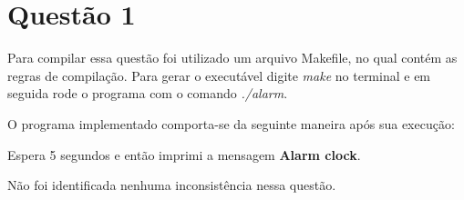 \section{Questão 1}

  Para compilar essa questão foi utilizado um arquivo Makefile, no qual contém as regras de compilação. Para gerar o executável digite \textit{make} no terminal e em seguida rode o programa com o comando \textit{./alarm}.

  O programa implementado comporta-se da seguinte maneira após sua execução:

   Espera 5 segundos e então imprimi a mensagem \textbf{Alarm clock}.

  Não foi identificada nenhuma inconsistência nessa questão.
